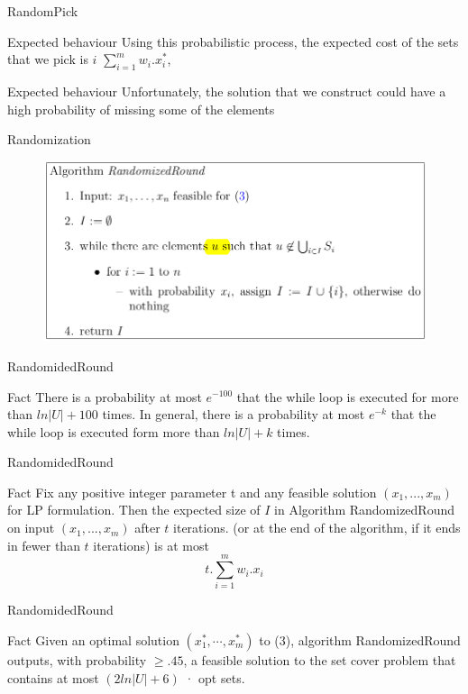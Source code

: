 \documentclass[24pt,pdf,xcolor=table]{beamer}
\begin{document}
\begin{frame}{RandomPick}
	\begin{block}{Expected behaviour}
	  Using this probabilistic process, the expected cost of the sets that we pick is $i$ $\sum_{i = 1}^m w_i.x^*_i$,
	\end{block}
	
	\begin{block}{Expected behaviour}
	  Unfortunately, the solution that we construct could have a high probability of missing some of the elements
	\end{block}
\end{frame}
	
\begin{frame}{Randomization}
	\begin{figure}[h]
		\centering
		\includegraphics[width=1.0\textwidth]{./images/rr.png}
	\end{figure}
\end{frame}		
	
\begin{frame}{RandomidedRound}
	\begin{block}{Fact}
	  There is a probability at most $e^{-100}$ that the while loop is executed for more than $ln|U| + 100$ times. In general, there is a probability at most $e^{-k}$ that the while loop is executed form more than $ln|U| + k$ times.
	\end{block}
\end{frame}

\begin{frame}{RandomidedRound}
	\begin{block}{Fact}
	  Fix any positive integer parameter t and any feasible solution $(x_1, ..., x_m)$ for LP formulation. Then the expected size of $I$ in Algorithm RandomizedRound on input $(x_1, ..., x_m)$ after $t$ iterations. (or at the end of the algorithm, if it ends in fewer than $t$ iterations) is at most
	  $$t . \sum_{i=1}^m w_i.x_i $$
	\end{block}
\end{frame}


\begin{frame}{RandomidedRound}
	\begin{block}{Fact}
	  Given an optimal solution $(x^*_1, \cdots, x^*_m )$ to (3), algorithm RandomizedRound outputs, with probability $\ge .45$, a feasible solution to the set cover problem that contains at most $(2ln|U| + 6)$ · opt sets.
	\end{block}
\end{frame}
\end{document}
